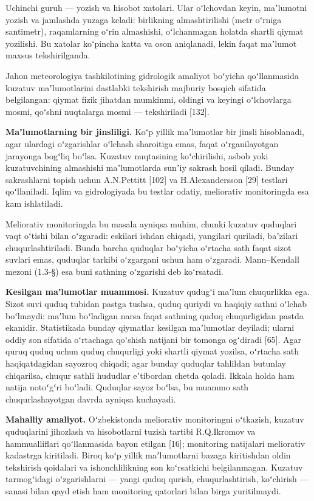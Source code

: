 Uchinchi guruh --- yozish va hisobot xatolari. Ular oʻlchovdan keyin,
maʼlumotni yozish va jamlashda yuzaga keladi: birlikning almashtirilishi
(metr oʻrniga santimetr), raqamlarning oʻrin almashishi, oʻlchanmagan
holatda shartli qiymat yozilishi. Bu xatolar koʻpincha katta va oson
aniqlanadi, lekin faqat maʼlumot maxsus tekshirilganda.

Jahon meteorologiya tashkilotining gidrologik amaliyot boʻyicha
qoʻllanmasida kuzatuv maʼlumotlarini dastlabki tekshirish majburiy
bosqich sifatida belgilangan: qiymat fizik jihatdan mumkinmi, oldingi va
keyingi oʻlchovlarga mosmi, qoʻshni nuqtalarga mosmi --- tekshiriladi
{[}132{]}.

\textbf{Maʼlumotlarning bir jinsliligi.} Koʻp yillik maʼlumotlar bir
jinsli hisoblanadi, agar ulardagi oʻzgarishlar oʻlchash sharoitiga emas,
faqat oʻrganilayotgan jarayonga bogʻliq boʻlsa. Kuzatuv nuqtasining
koʻchirilishi, asbob yoki kuzatuvchining almashishi maʼlumotlarda sunʼiy
sakrash hosil qiladi. Bunday sakrashlarni topish uchun A.N.Pettitt
{[}102{]} va H.Alexandersson {[}29{]} testlari qoʻllaniladi. Iqlim va
gidrologiyada bu testlar odatiy, meliorativ monitoringda esa kam
ishlatiladi.

Meliorativ monitoringda bu masala ayniqsa muhim, chunki kuzatuv
quduqlari vaqt oʻtishi bilan oʻzgaradi: eskilari ishdan chiqadi,
yangilari quriladi, baʼzilari chuqurlashtiriladi. Bunda barcha quduqlar
boʻyicha oʻrtacha sath faqat sizot suvlari emas, quduqlar tarkibi
oʻzgargani uchun ham oʻzgaradi. Mann--Kendall mezoni (1.3-§) esa buni
sathning oʻzgarishi deb koʻrsatadi.

\textbf{Kesilgan maʼlumotlar muammosi.} Kuzatuv qudugʻi maʼlum
chuqurlikka ega. Sizot suvi quduq tubidan pastga tushsa, quduq quriydi
va haqiqiy sathni oʻlchab boʻlmaydi: maʼlum boʻladigan narsa faqat
sathning quduq chuqurligidan pastda ekanidir. Statistikada bunday
qiymatlar kesilgan maʼlumotlar deyiladi; ularni oddiy son sifatida
oʻrtachaga qoʻshish natijani bir tomonga ogʻdiradi {[}65{]}. Agar quruq
quduq uchun quduq chuqurligi yoki shartli qiymat yozilsa, oʻrtacha sath
haqiqatdagidan sayozroq chiqadi; agar bunday quduqlar tahlildan butunlay
chiqarilsa, chuqur sathli hududlar eʼtibordan chetda qoladi. Ikkala
holda ham natija notoʻgʻri boʻladi. Quduqlar sayoz boʻlsa, bu muammo
sath chuqurlashayotgan davrda ayniqsa kuchayadi.

\textbf{Mahalliy amaliyot.} Oʻzbekistonda meliorativ monitoringni
oʻtkazish, kuzatuv quduqlarini jihozlash va hisobotlarni tuzish tartibi
R.Q.Ikromov va hammualliflari qoʻllanmasida bayon etilgan {[}16{]};
monitoring natijalari meliorativ kadastrga kiritiladi. Biroq koʻp yillik
maʼlumotlarni bazaga kiritishdan oldin tekshirish qoidalari va
ishonchlilikning son koʻrsatkichi belgilanmagan. Kuzatuv tarmogʻidagi
oʻzgarishlarni --- yangi quduq qurish, chuqurlashtirish, koʻchirish ---
sanasi bilan qayd etish ham monitoring qatorlari bilan birga
yuritilmaydi.

